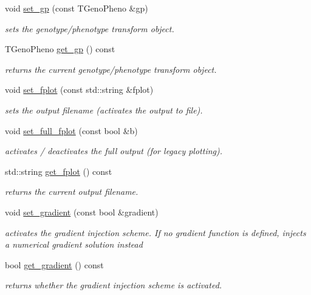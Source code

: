\begin{DoxyCompactItemize}
void \hyperlink{classlibcmaes_1_1Parameters_aeeab862124b864147e143bd86eb51cb5}{set\+\_\+gp} (const T\+Geno\+Pheno \&gp)
\begin{DoxyCompactList}\small\item\em sets the genotype/phenotype transform object. \end{DoxyCompactList}\item 
T\+Geno\+Pheno \hyperlink{classlibcmaes_1_1Parameters_a365039e6948ee2242c0ad34ed4ff02ab}{get\+\_\+gp} () const 
\begin{DoxyCompactList}\small\item\em returns the current genotype/phenotype transform object. \end{DoxyCompactList}\item 
void \hyperlink{classlibcmaes_1_1Parameters_ab96a2149ca63863d3f5618f54097df44}{set\+\_\+fplot} (const std\+::string \&fplot)
\begin{DoxyCompactList}\small\item\em sets the output filename (activates the output to file). \end{DoxyCompactList}\item 
void \hyperlink{classlibcmaes_1_1Parameters_a4d428eba994c5cdb7ab67729e4fdac6a}{set\+\_\+full\+\_\+fplot} (const bool \&b)
\begin{DoxyCompactList}\small\item\em activates / deactivates the full output (for legacy plotting). \end{DoxyCompactList}\item 
std\+::string \hyperlink{classlibcmaes_1_1Parameters_a6787bd16e95db6125a5e131ad58574cc}{get\+\_\+fplot} () const 
\begin{DoxyCompactList}\small\item\em returns the current output filename. \end{DoxyCompactList}\item 
void \hyperlink{classlibcmaes_1_1Parameters_a38082ad1568c356caff5b299d6faea11}{set\+\_\+gradient} (const bool \&gradient)
\begin{DoxyCompactList}\small\item\em activates the gradient injection scheme. If no gradient function is defined, injects a numerical gradient solution instead \end{DoxyCompactList}\item 
bool \hyperlink{classlibcmaes_1_1Parameters_ac7f6c27e00d1c0d744221b5a32e9efee}{get\+\_\+gradient} () const 
\begin{DoxyCompactList}\small\item\em returns whether the gradient injection scheme is activated. \end{DoxyCompactList}\item 

\end{DoxyCompactItemize}
